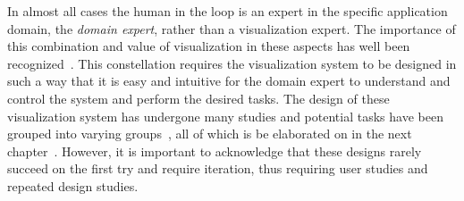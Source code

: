 In almost all cases the human in the loop is an expert in the specific application domain, the \emph{domain expert}, rather than a visualization expert.  The importance of this combination and value of visualization in these aspects has well been recognized~\cite{van2005value}.  This constellation requires the visualization system to be designed in such a way that it is easy and intuitive for the domain expert to understand and control the system and perform the desired tasks.  The design of these visualization system has undergone many studies and potential tasks have been grouped into varying groups~\cite{brehmer2014visualizing}, all of which is be elaborated on in the next chapter~\cite{munzner2014visualization}.  However, it is important to acknowledge that these designs rarely succeed on the first try and require iteration, thus requiring user studies and repeated design studies.




